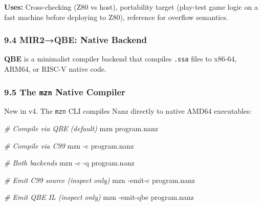 \documentclass[
  11pt,
]{article}
\newenvironment{Shaded}{\begin{snugshade}}{\end{snugshade}}
\newcommand{\AttributeTok}[1]{\textcolor[rgb]{0.13,0.29,0.53}{#1}}
\newcommand{\CommentTok}[1]{\textcolor[rgb]{0.56,0.35,0.01}{\textit{#1}}}
\newcommand{\ExtensionTok}[1]{#1}
\newcommand{\NormalTok}[1]{#1}
\begin{document}
\textbf{Uses:} Cross-checking (Z80 vs host), portability target
(play-test game logic on a fast machine before deploying to Z80),
reference for overflow semantics.

\hypertarget{mir2qbe-native-backend}{%
\subsubsection{9.4 MIR2→QBE: Native
Backend}\label{mir2qbe-native-backend}}

\textbf{QBE} is a minimalist compiler backend that compiles
\texttt{.ssa} files to x86-64, ARM64, or RISC-V native code.

\begin{Shaded}
\end{Shaded}

\hypertarget{the-mzn-native-compiler}{%
\subsubsection{\texorpdfstring{9.5 The \texttt{mzn} Native
Compiler}{9.5 The mzn Native Compiler}}\label{the-mzn-native-compiler}}

New in v4. The \texttt{mzn} CLI compiles Nanz directly to native AMD64
executables:

\begin{Shaded}
\begin{Highlighting}[]
\CommentTok{\# Compile via QBE (default)}
\ExtensionTok{mzn}\NormalTok{ program.nanz}

\CommentTok{\# Compile via C99}
\ExtensionTok{mzn} \AttributeTok{{-}c}\NormalTok{ program.nanz}

\CommentTok{\# Both backends}
\ExtensionTok{mzn} \AttributeTok{{-}c} \AttributeTok{{-}q}\NormalTok{ program.nanz}

\CommentTok{\# Emit C99 source (inspect only)}
\ExtensionTok{mzn} \AttributeTok{{-}emit{-}c}\NormalTok{ program.nanz}

\CommentTok{\# Emit QBE IL (inspect only)}
\ExtensionTok{mzn} \AttributeTok{{-}emit{-}qbe}\NormalTok{ program.nanz}
\end{Highlighting}
\end{Shaded}
\end{document}
